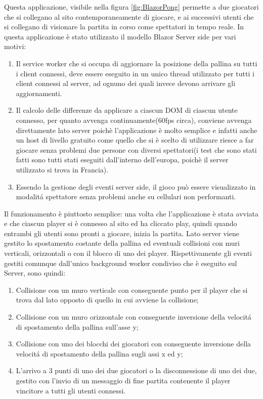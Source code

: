 Questa applicazione, visibile nella figura \ref{fig:BlazorPong} permette a due giocatori che si collegano al sito contemporaneamente di giocare, e ai successivi utenti che si collegano di visionare la partita in corso come spettatori in tempo reale.
In questa applicazione \`e stato utilizzato il modello Blazor Server side per vari motivi:
\begin{enumerate}
	\item Il service worker che si occupa di aggiornare la posizione della pallina su tutti i client connessi, deve essere eseguito in un unico thread utilizzato per tutti i client connessi al server, ad ognuno dei quali invece devono arrivare gli aggiornamenti.
	\item Il calcolo delle differenze da applicare a ciascun DOM di ciascun utente connesso, per quanto avvenga continuamente(60fps circa), conviene avvenga direttamente lato server poich\`e l'applicazione \`e molto semplice e infatti anche un host di livello gratuito come quello che si \`e scelto di utilizzare riesce a far giocare senza problemi due persone con diversi spettatori(i test che sono stati fatti sono tutti stati eseguiti dall'interno dell'europa, poich\`e il server utilizzato si trova in Francia).
	\item Essendo la gestione degli eventi server side, il gioco pu\`o essere visualizzato in modalit\'a spettatore senza problemi anche su cellulari non performanti.	
\end{enumerate}

Il funzionamento \`e piuttosto semplice: una volta che l'applicazione \`e stata avviata e che ciascun player si \`e connesso al sito ed ha cliccato play, quindi quando entrambi gli utenti sono pronti a giocare, inizia la partita.
Lato server viene gestito lo spostamento costante della pallina ed eventuali collisioni con muri verticali, orizzontali o con il blocco di uno dei player.
Rispettivamente gli eventi gestiti comunque dall'unico background worker condiviso che \`e eseguito sul Server, sono quindi:
\begin{enumerate}
	\item Collisione con un muro verticale con conseguente punto per il player che si trova dal lato opposto di quello in cui avviene la collisione;
	\item Collisione con un muro orizzontale con conseguente inversione della velocit\'a di spostamento della pallina sull'asse y;
	\item Collisione con uno dei blocchi dei giocatori con conseguente inversione della velocit\'a di spostamento della pallina sugli assi x ed y;
	\item L'arrivo a 3 punti di uno dei due giocatori o la disconnessione di uno dei due, gestito con l'invio di un messaggio di fine partita contenente il player vincitore a tutti gli utenti connessi.
\end{enumerate}

